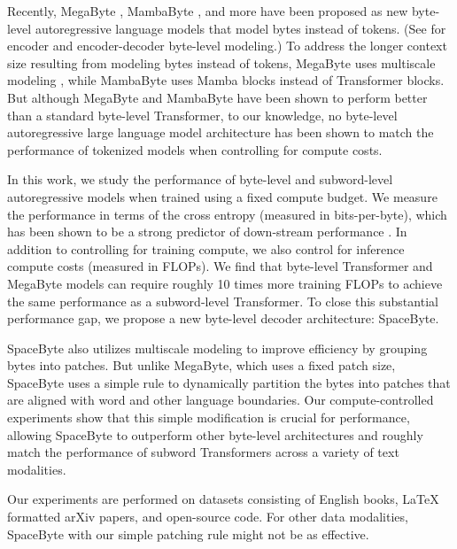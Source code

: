 Recently, MegaByte \cite{megabyte}, MambaByte \cite{mambabyte}, and more \cite{thawani2023wordpooled,nawrot2022pooling,lester2024compressed,Fleshman2023Toucan,limisiewicz2024myte} have been proposed as new byte-level autoregressive language models that model bytes instead of tokens. (See \cite{xue2022byt5,godey2022MANTa,clark2103canine,boukkouri2020characterbert,tay2021charformer,edman2022subword,sreedhar2023bytefusion,edman2023wait,cao2023character} for encoder and encoder-decoder byte-level modeling.) To address the longer context size resulting from modeling bytes instead of tokens, MegaByte uses multiscale modeling \cite{subramanian2020multiscale,nawrot2022hierarchical,dai2020funnel}, while MambaByte uses Mamba blocks \cite{gu2024mamba} instead of Transformer blocks. But although MegaByte and MambaByte have been shown to perform better than a standard byte-level Transformer, to our knowledge, no byte-level autoregressive large language model architecture has been shown to match the performance of tokenized models when controlling for compute costs.

In this work, we study the performance of byte-level and subword-level autoregressive models when trained using a fixed compute budget. We measure the performance in terms of the cross entropy (measured in bits-per-byte), which has been shown to be a strong predictor of down-stream performance \cite{huang2024compression}. In addition to controlling for training compute, we also control for inference compute costs (measured in FLOPs). We find that byte-level Transformer and MegaByte models can require roughly 10 times more training FLOPs to achieve the same performance as a subword-level Transformer. To close this substantial performance gap, we propose a new byte-level decoder architecture: SpaceByte.

SpaceByte also utilizes multiscale modeling to improve efficiency by grouping bytes into patches. But unlike MegaByte, which uses a fixed patch size, SpaceByte uses a simple rule to dynamically partition the bytes into patches that are aligned with word and other language boundaries. Our compute-controlled experiments show that this simple modification is crucial for performance, allowing SpaceByte to outperform other byte-level architectures and roughly match the performance of subword Transformers across a variety of text modalities.

Our experiments are performed on datasets consisting of English books, LaTeX formatted arXiv papers, and open-source code. For other data modalities, SpaceByte with our simple patching rule might not be as effective.


